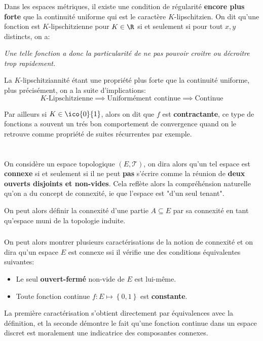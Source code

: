 \subsection*{}
Dans les espaces métriques, il existe une condition de régularité \textbf{encore plus forte} que la continuité uniforme qui est le caractère \(K\)-lipschitzien. On dit qu'une fonction est \(K\)-lipschitzienne pour \(K \in \R\) si et seulement si pour tout \(x, y\) distincts, on a:
\begin{center}
   \textit{
      Une telle fonction a donc la particularité de ne pas pouvoir croitre ou décroitre trop rapidement.
   }
\end{center}
La \(K\)-lipschitziannité étant une propriété plus forte que la continuité uniforme, plus précisément, on a la suite d'implications:
\[
   K\text{-Lipschitzienne} \implies \text{Uniformément continue} \implies \text{Continue}
\]


Par ailleurs si \(K \in \ico{0}{1}\), alors on dit que \(f\) est \textbf{contractante}, ce type de fonctions a souvent un trés bon comportement de convergence quand on le retrouve comme propriété de suites récurrentes par exemple.

\chapter*{}
On considère un espace topologique \((E, \mathcal{T})\), on dira alors qu'un tel espace est \textbf{connexe} si et seulement si il ne peut \textbf{pas} s'écrire comme la réunion de \textbf{deux ouverts disjoints et non-vides}. Cela reflète alors la compréhénsion naturelle qu'on a du concept de connexité, ie que l'espace est "d'un seul tenant".\<

On peut alors définir la connexité d'une partie \( A \subseteq E \) par sa connexité en tant qu'espace muni de la topologie induite.
\subsection*{}
On peut alors montrer plusieurs caractérisations de la notion de connexité et on dira qu'un espace \( E \) est connexe ssi il vérifie une des conditions équivalentes suivantes:
\begin{itemize}
   \item Le seul \textbf{ouvert-fermé} non-vide de \( E \) est lui-même.
   \item Toute fonction continue \( f : E \longmapsto \left\{ 0, 1 \right\}  \) est \textbf{constante}.
\end{itemize}
La première caractérisation s'obtient directement par équivalences avec la définition, et la seconde démontre le fait qu'une fonction continue dans un espace discret est moralement une indicatrice des composantes connexes.
